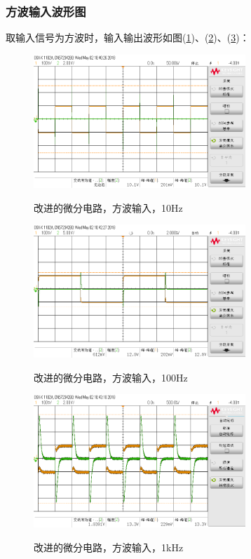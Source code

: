 \documentclass[a4paper]{article}
\begin{document}
\subsubsection{方波输入波形图}
取输入信号为方波时，输入输出波形如图(\ref{10Hz_diff_s})、(\ref{100Hz_diff_s})、(\ref{1kHz_diff_s})：
\begin{figure}[!h]
\centering
\includegraphics[width=8cm]{fig/scope_7.png}\\
\caption{改进的微分电路，方波输入，10Hz}\label{10Hz_diff_s}
\end{figure}
\begin{figure}[!h]
\centering
\includegraphics[width=8cm]{fig/scope_8.png}\\
\caption{改进的微分电路，方波输入，100Hz}\label{100Hz_diff_s}
\end{figure}
\begin{figure}[!h]
\centering
\includegraphics[width=8cm]{fig/scope_9.png}\\
\caption{改进的微分电路，方波输入，1kHz}\label{1kHz_diff_s}
\end{figure}
\end{document}

